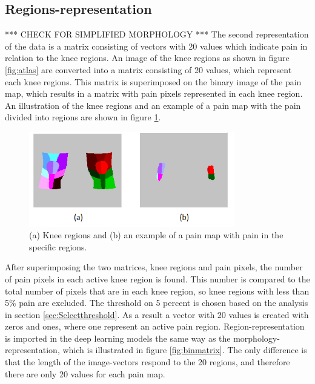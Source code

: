 \subsection{Regions-representation}
*** CHECK FOR SIMPLIFIED MORPHOLOGY ***
The second representation of the data is a matrix consisting of vectors with 20 values which indicate pain in relation to the knee regions.
An image of the knee regions as shown in figure \ref{fig:atlas} are converted into a matrix consisting of 20 values, which represent each knee regions. This matrix is superimposed on the binary image of the pain map, which results in a matrix with pain pixels represented in each knee region. 
An illustration of the knee regions and an example of a pain map with the pain divided into regions are shown in figure \ref{fig:binregions}.

\begin{figure} [H]
\centering
\includegraphics[width=0.8\textwidth]{figures/binregions}
\caption{(a) Knee regions and (b) an example of a pain map with pain in the specific regions.}
\label{fig:binregions}
\end{figure}

\noindent
After superimposing the two matrices, knee regions and pain pixels, the number of pain pixels in each active knee region is found. This number is compared to the total number of pixels that are in each knee region, so knee regions with less than 5\% pain are excluded. The threshold on 5 percent is chosen based on the analysis in section \ref{sec:Selectthreshold}. As a result a vector with 20 values is created with zeros and ones, where one represent an active pain region. Region-representation is imported in the deep learning models the same way as the morphology-representation, which is illustrated in figure \ref{fig:binmatrix}. The only difference is that the length of the image-vectors respond to the 20 regions, and therefore there are only 20 values for each pain map.


